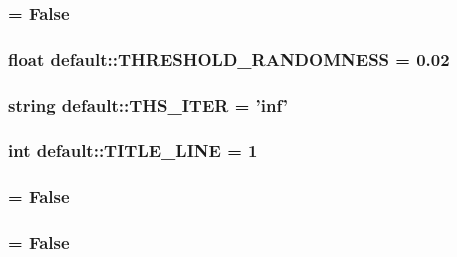 \hypertarget{namespacedefault_9b628d43cf39c122618124e250f484d4}{
\subsubsection[{TEST}]{ = False}}
\label{namespacedefault_9b628d43cf39c122618124e250f484d4}


\hypertarget{namespacedefault_6824ae496ae216b60d5f134a9bb0aaea}{
\subsubsection[{THRESHOLD\_\-RANDOMNESS}]{\setlength{\rightskip}{0pt plus 5cm}float {\bf default::THRESHOLD\_\-RANDOMNESS} = 0.02}}
\label{namespacedefault_6824ae496ae216b60d5f134a9bb0aaea}


\hypertarget{namespacedefault_25dbe07c88b53f5e3d634a41030abc92}{
\subsubsection[{THS\_\-ITER}]{\setlength{\rightskip}{0pt plus 5cm}string {\bf default::THS\_\-ITER} = 'inf'}}
\label{namespacedefault_25dbe07c88b53f5e3d634a41030abc92}


\hypertarget{namespacedefault_38fe4c2b86af6bcf5c5a4b568a55b865}{
\subsubsection[{TITLE\_\-LINE}]{\setlength{\rightskip}{0pt plus 5cm}int {\bf default::TITLE\_\-LINE} = 1}}
\label{namespacedefault_38fe4c2b86af6bcf5c5a4b568a55b865}


\hypertarget{namespacedefault_75efb1111f068d4ec2410c969f8e8163}{
\subsubsection[{TITLES}]{ = False}}
\label{namespacedefault_75efb1111f068d4ec2410c969f8e8163}


\hypertarget{namespacedefault_faa31f8e93aab4e3c4ac7150c07a2163}{
\subsubsection[{VERBOSE}]{ = False}}
\label{namespacedefault_faa31f8e93aab4e3c4ac7150c07a2163}


